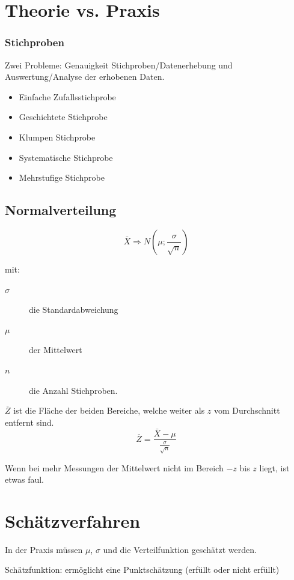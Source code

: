 \section{Theorie vs. Praxis}

\subsubsection{Stichproben}

Zwei Probleme: Genauigkeit Stichproben/Datenerhebung und Auswertung/Analyse der erhobenen Daten.

\begin{itemize}
	\item	Einfache Zufallsstichprobe
	\item	Geschichtete Stichprobe
	\item	Klumpen Stichprobe
	\item	Systematische Stichprobe
	\item	Mehrstufige Stichprobe
\end{itemize}

\subsection{Normalverteilung}

\[
\bar{X} \Rightarrow N\left(\mu; \frac{\sigma}{\sqrt{n}}\right)
\]

mit:
\begin{description}
	\item[$\sigma$] die Standardabweichung
	\item[$\mu$] der Mittelwert
	\item[$n$] die Anzahl Stichproben.
\end{description}

$\overline{Z}$ ist die Fläche der beiden Bereiche, welche weiter als $z$ vom Durchschnitt entfernt sind.
\[
\overline{Z} = \frac{\bar{X}-\mu}{\frac{\sigma}{\sqrt{n}}}
\]

Wenn bei mehr Messungen der Mittelwert nicht im Bereich $-z$ bis $z$ liegt, ist etwas faul.

\section{Schätzverfahren}

In der Praxis müssen $\mu$, $\sigma$ und die Verteilfunktion geschätzt werden.

Schätzfunktion: ermöglicht eine Punktschätzung (erfüllt oder nicht erfüllt)

